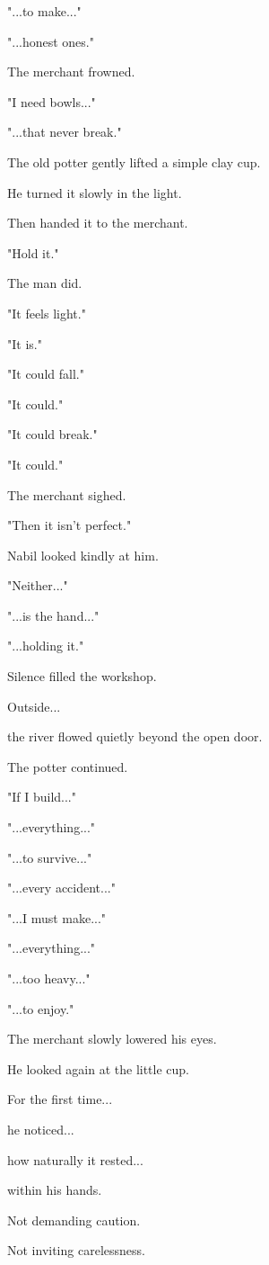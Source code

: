 \documentclass[12pt,openany]{book}
\begin{document}
"...to make..."

"...honest ones."

The merchant frowned.

"I need bowls..."

"...that never break."

The old potter gently lifted a simple clay cup.

He turned it slowly in the light.

Then handed it to the merchant.

"Hold it."

The man did.

"It feels light."

"It is."

"It could fall."

"It could."

"It could break."

"It could."

The merchant sighed.

"Then it isn't perfect."

Nabil looked kindly at him.

"Neither..."

"...is the hand..."

"...holding it."

Silence filled the workshop.

Outside...

the river flowed quietly beyond the open door.

The potter continued.

"If I build..."

"...everything..."

"...to survive..."

"...every accident..."

"...I must make..."

"...everything..."

"...too heavy..."

"...to enjoy."

The merchant slowly lowered his eyes.

He looked again at the little cup.

For the first time...

he noticed...

how naturally it rested...

within his hands.

Not demanding caution.

Not inviting carelessness.
\end{document}
